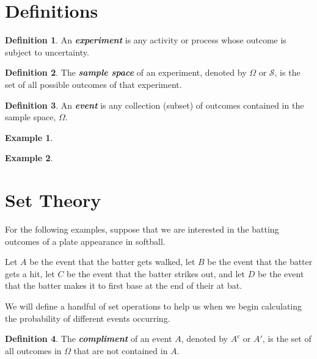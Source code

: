 \documentclass[
  11pt,
]{book}
\theoremstyle{definition}
\newtheorem{definition}{Definition}[chapter]
\theoremstyle{definition}
\newtheorem{example}{Example}[chapter]
\theoremstyle{definition}
\theoremstyle{definition}
\theoremstyle{remark}
\begin{document}
\hypertarget{definitions-1}{%
\section{Definitions}\label{definitions-1}}

\begin{definition}
An \textbf{\emph{experiment}} is any activity or process whose outcome is subject to uncertainty.
\end{definition}

\begin{definition}
The \textbf{\emph{sample space}} of an experiment, denoted by \(\Omega\) or \(\mathcal{S}\), is the set of all possible outcomes of that experiment.
\end{definition}

\begin{definition}
An \textbf{\emph{event}} is any collection (subset) of outcomes contained in the sample space, \(\Omega\).
\end{definition}

\begin{example}
\[ \]
\end{example}

\hfill\break
\hfill\break
\hfill\break
\hfill\break
\hfill\break

\begin{example}
\[ \]
\end{example}

\hfill\break
\hfill\break
\hfill\break
\hfill\break
\hfill\break

\hypertarget{set-theory}{%
\section{Set Theory}\label{set-theory}}

For the following examples, suppose that we are interested in the batting outcomes of a plate appearance in softball.

Let \(A\) be the event that the batter gets walked, let \(B\) be the event that the batter gets a hit, let \(C\) be the event that the batter strikes out, and let \(D\) be the event that the batter makes it to first base at the end of their at bat.

We will define a handful of set operations to help us when we begin calculating the probability of different events occurring.

\begin{definition}
The \textbf{\emph{compliment}} of an event \(A\), denoted by \(A^c\) or \(A'\), is the set of all outcomes in \(\Omega\) that are not contained in \(A\).
\end{definition}
\end{document}
